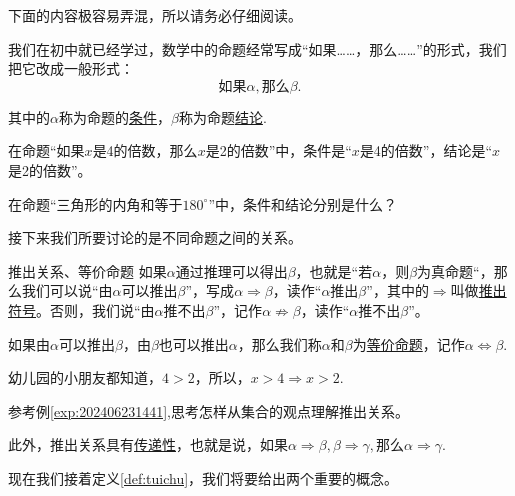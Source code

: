 \documentclass[lang=cn,math=cm,chinesefont=nofont,11pt,scheme=chinese,onecol]{elegantbook}
\begin{document}
\begin{remark}
  下面的内容极容易弄混，所以请务必仔细阅读。
\end{remark}

我们在初中就已经学过，数学中的命题经常写成“如果……，那么……”的形式，我们把它改成一般形式：
$$\text{如果}\alpha ,\text{那么}\beta.$$

其中的$\alpha$称为命题的\underline{条件}，$\beta$称为命题\underline{结论}.

\begin{example}
  在命题“如果$x$是4的倍数，那么$x$是2的倍数”中，条件是“$x$是4的倍数”，结论是“$x$是2的倍数”。
\end{example}

\begin{exercise}
  在命题“三角形的内角和等于$180^{\circ}$”中，条件和结论分别是什么？
\end{exercise}

\hspace*{\fill}

接下来我们所要讨论的是不同命题之间的关系。

\begin{definition}{推出关系、等价命题}\label{def:tuichu}
  如果$\alpha$通过推理可以得出$\beta$，也就是“若$\alpha$，则$\beta$为真命题“，那么我们可以说“由$\alpha$可以推出$\beta$”，写成$\alpha\Rightarrow\beta$，读作“$\alpha$推出$\beta$”，其中的$\Rightarrow$叫做\underline{推出符号}。否则，我们说“由$\alpha$推不出$\beta$”，记作$\alpha\nRightarrow\beta$，读作“$\alpha$推不出$\beta$”。

  如果由$\alpha$可以推出$\beta$，由$\beta$也可以推出$\alpha$，那么我们称$\alpha$和$\beta$为\underline{等价命题}，记作$\alpha\Leftrightarrow\beta$.
\end{definition}

\begin{example}\label{exp:202406231441}
  幼儿园的小朋友都知道，$4>2$，所以，$x>4\Rightarrow x>2$.
\end{example}

\begin{problem}\label{202406262000}
  参考例\ref{exp:202406231441},思考怎样从集合的观点理解推出关系。
\end{problem}

此外，推出关系具有\underline{传递性}，也就是说，如果$\alpha\Rightarrow\beta,\beta\Rightarrow\gamma,$那么$\alpha\Rightarrow\gamma$.

\hspace*{\fill}

现在我们接着定义\ref{def:tuichu}，我们将要给出两个重要的概念。
\end{document}
